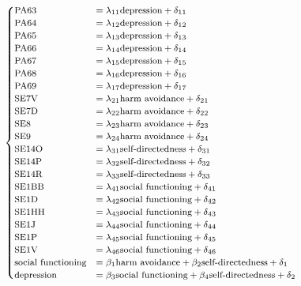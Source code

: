 \documentclass[11pt]{article}
\begin{document}
\begin{equation}
    \footnotesize
    \label{eq:base_model}
    \begin{cases}
    \textrm{PA63}  & = \lambda_{11} \textrm{depression} + \delta_{11} \\
    \textrm{PA64}  & = \lambda_{12} \textrm{depression} + \delta_{12} \\
    \textrm{PA65}  & = \lambda_{13} \textrm{depression} + \delta_{13} \\
    \textrm{PA66}  & = \lambda_{14} \textrm{depression} + \delta_{14} \\
    \textrm{PA67}  & = \lambda_{15} \textrm{depression} + \delta_{15} \\
    \textrm{PA68}  & = \lambda_{16} \textrm{depression} + \delta_{16} \\
    \textrm{PA69}  & = \lambda_{17} \textrm{depression} + \delta_{17} \\
    \textrm{SE7V}  & = \lambda_{21} \textrm{harm avoidance} + \delta_{21} \\
    \textrm{SE7D}  & = \lambda_{22} \textrm{harm avoidance} + \delta_{22} \\
    \textrm{SE8}   & = \lambda_{23} \textrm{harm avoidance} + \delta_{23} \\
    \textrm{SE9}   & = \lambda_{24} \textrm{harm avoidance} + \delta_{24} \\
    \textrm{SE14O} & = \lambda_{31} \textrm{self-directedness} + \delta_{31} \\
    \textrm{SE14P} & = \lambda_{32} \textrm{self-directedness} + \delta_{32} \\
    \textrm{SE14R} & = \lambda_{33} \textrm{self-directedness} + \delta_{33} \\
    \textrm{SE1BB} & = \lambda_{41} \textrm{social functioning} + \delta_{41} \\
    \textrm{SE1D}  & = \lambda_{42} \textrm{social functioning} + \delta_{42} \\
    \textrm{SE1HH} & = \lambda_{43} \textrm{social functioning} + \delta_{43} \\
    \textrm{SE1J}  & = \lambda_{44} \textrm{social functioning} + \delta_{44} \\
    \textrm{SE1P}  & = \lambda_{45} \textrm{social functioning} + \delta_{45} \\
    \textrm{SE1V}  & = \lambda_{46} \textrm{social functioning} + \delta_{46} \\
    \textrm{social functioning} & = \beta_1 \textrm{harm avoidance} + \beta_2 \textrm{self-directedness} + \delta_1 \\
    \textrm{depression} & = \beta_3 \textrm{social functioning} + \beta_4 \textrm{self-directedness} + \delta_2
    \end{cases}
\end{equation}
\end{document}
